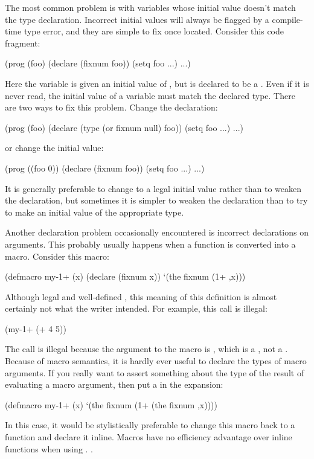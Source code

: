 The most common problem is with variables whose initial value doesn't match the
type declaration.  Incorrect initial values will always be flagged by a
compile-time type error, and they are simple to fix once located.  Consider
this code fragment:
\begin{example}
(prog (foo)
  (declare (fixnum foo))
  (setq foo ...)
  ...)
\end{example}
Here the variable  is given an initial value of \false, but is declared
to be a .  Even if it is never read, the initial value of a variable
must match the declared type.  There are two ways to fix this problem.  Change
the declaration:
\begin{example}
(prog (foo)
  (declare (type (or fixnum null) foo))
  (setq foo ...)
  ...)
\end{example}
or change the initial value:
\begin{example}
(prog ((foo 0))
  (declare (fixnum foo))
  (setq foo ...)
  ...)
\end{example}
It is generally preferable to change to a legal initial value rather than to
weaken the declaration, but sometimes it is simpler to weaken the
declaration than to try to make an initial value of the appropriate type.


Another declaration problem occasionally encountered is incorrect declarations
on  arguments.  This probably usually happens when a function is
converted into a macro.   Consider this macro:
\begin{lisp}
(defmacro my-1+ (x)
  (declare (fixnum x))
  `(the fixnum (1+ ,x)))
\end{lisp}
Although legal and well-defined \clisp, this meaning of this definition is
almost certainly not what the writer intended.  For example, this call is
illegal:
\begin{lisp}
(my-1+ (+ 4 5))
\end{lisp}
The call is illegal because the argument to the macro is , which
is a , not a .  Because of macro semantics, it is hardly ever
useful to declare the types of macro arguments.  If you really want to assert
something about the type of the result of evaluating a macro argument, then put
a  in the expansion:
\begin{lisp}
(defmacro my-1+ (x)
  `(the fixnum (1+ (the fixnum ,x))))
\end{lisp}
In this case, it would be stylistically preferable to change this macro back to
a function and declare it inline.  Macros have no efficiency advantage over
inline functions when using \Python.  .


